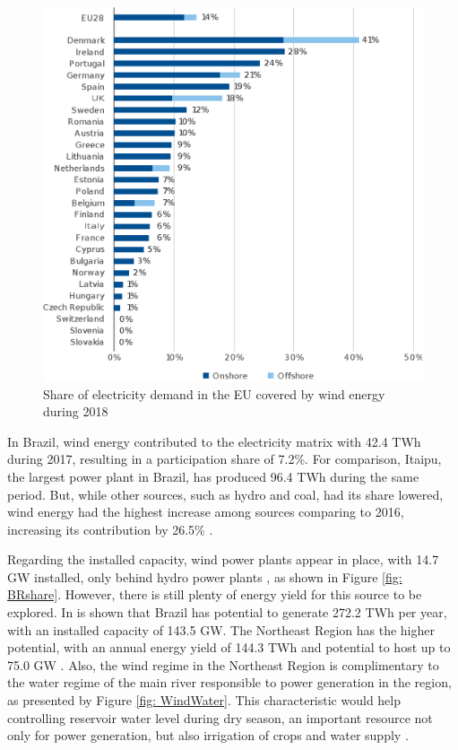 \begin{figure}[h]
	\caption{Share of electricity demand in the EU covered by wind energy during 2018}
	\begin{center}
		\includegraphics[scale=0.65]{Images/EUrank.eps}
	\end{center}
	\label{fig: EUrank}
\end{figure}

In Brazil, wind energy contributed to the electricity matrix with 42.4 TWh during 2017, resulting in a participation share of 7.2\%. For comparison, Itaipu, the largest power plant in Brazil, has produced 96.4 TWh during the same period. But, while other sources, such as hydro and coal, had its share lowered, wind energy had the highest increase among sources comparing to 2016, increasing its contribution by 26.5\% \cite{EPE2018}. 

Regarding the installed capacity, wind power plants appear in  place, with 14.7 GW installed, only behind hydro power plants \cite{ABEEolica2018}, as shown in Figure \ref{fig: BRshare}. However, there is still plenty of energy yield for this source to be explored. In \cite{Atlas2001} is shown that Brazil has potential to generate 272.2 TWh per year, with an installed capacity of 143.5 GW. The Northeast Region has the higher potential, with an annual energy yield of 144.3 TWh and potential to host up to 75.0 GW . Also, the wind regime in the Northeast Region is complimentary to the water regime of the main river responsible to power generation in the region, as presented by Figure \ref{fig: WindWater}. This characteristic would help controlling reservoir water level during dry season, an important resource not only for power generation, but also irrigation of crops and water supply \cite{ANEEL2005}.

